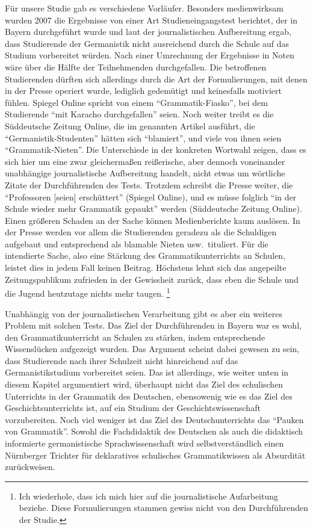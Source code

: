 Für unsere Studie gab es verschiedene Vorläufer.
Besonders medienwirksam wurden 2007 die Ergebnisse von einer Art Studieneingangstest berichtet, der in Bayern durchgeführt wurde und laut der journalistischen Aufbereitung \citep{Spiegelonline2007,Szonline2007} ergab, dass Studierende der Germanistik nicht ausreichend durch die Schule auf das Studium vorbereitet würden.
Nach einer Umrechnung der Ergebnisse in Noten wäre über die Hälfte der Teilnehmenden durchgefallen.
Die betroffenen Studierenden dürften sich allerdings durch die Art der Formulierungen, mit denen in der Presse operiert wurde, lediglich gedemütigt und keinesfalls motiviert fühlen.
Spiegel Online spricht von einem "`Grammatik-Fiasko"', bei dem Studierende "`mit Karacho durchgefallen"' seien.
Noch weiter treibt es die Süddeutsche Zeitung Online, die im genannten Artikel ausführt, die "`Germanistik-Studenten"' hätten sich "`blamiert"', und viele von ihnen seien "`Grammatik-Nieten"'.
Die Unterschiede in der konkreten Wortwahl zeigen, dass es sich hier um eine zwar gleichermaßen reißerische, aber dennoch voneinander unabhängige journalistische Aufbereitung handelt, nicht etwas um wörtliche Zitate der Durchführenden des Tests.
Trotzdem schreibt die Presse weiter, die "`Professoren [seien] erschüttert"' (Spiegel Online), und es müsse folglich "`in der Schule wieder mehr Grammatik gepaukt"' werden (Süddeutsche Zeitung Online). 
Einen größeren Schaden an der Sache können Medienberichte kaum auslösen.
In der Presse werden vor allem die Studierenden geradezu als die Schuldigen aufgebaut und entsprechend als blamable Nieten usw.\ tituliert.
Für die intendierte Sache, also eine Stärkung des Grammatikunterrichts an Schulen, leistet dies in jedem Fall keinen Beitrag.
Höchstens lehnt sich das angepeilte Zeitungspublikum zufrieden in der Gewissheit zurück, dass eben die Schule und die Jugend heutzutage nichts mehr taugen.%
\footnote{Ich wiederhole, dass ich mich hier auf die journalistische Aufarbeitung beziehe.
Diese Formulierungen stammen gewiss nicht von den Durchführenden der Studie.}

Unabhängig von der journalistischen Verarbeitung gibt es aber ein weiteres Problem mit solchen Tests.
Das Ziel der Durchführenden in Bayern war es wohl, den Grammatikunterricht an Schulen zu stärken, indem entsprechende Wissenslücken aufgezeigt wurden.
Das Argument scheint dabei gewesen zu sein, dass Studierende nach ihrer Schulzeit nicht hinreichend auf das Germanistikstudium vorbereitet seien.
Das ist allerdings, wie weiter unten in diesem Kapitel argumentiert wird, überhaupt nicht das Ziel des schulischen Unterrichts in der Grammatik des Deutschen, ebensowenig wie es das Ziel des Geschichtsunterrichts ist, auf ein Studium der Geschichtswissenschaft vorzubereiten.
Noch viel weniger ist das Ziel des Deutschunterrichts das "`Pauken von Grammatik"'.
Sowohl die Fachdidaktik des Deutschen als auch die didaktisch informierte germanistische Sprachwissenschaft wird selbstverständlich einen Nürnberger Trichter für deklaratives schulisches Grammatikwissen als Absurdität zurückweisen.

